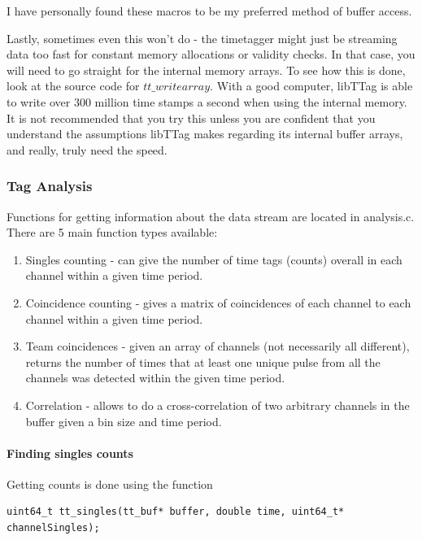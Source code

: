 \documentclass[10pt]{article}
\begin{document}
I have personally found these macros to be my preferred method of buffer access. 

Lastly, sometimes even this won't do - the timetagger might just be streaming data too fast
for constant memory allocations or validity checks. In that case, you will need to go straight for the internal memory arrays.
To see how this is done, look at the source code for $tt\_writearray$. With a good computer, libTTag is able to write over 300 million time stamps a second
when using the internal memory. It is not recommended that you try this unless you are confident that you understand the assumptions 
libTTag makes regarding its internal buffer arrays, and really, truly need the speed.


\subsubsection{Tag Analysis}
Functions for getting information about the data stream are located in analysis.c. There are 5 main function types available:
\begin{enumerate}
\item Singles counting - can give the number of time tags (counts) overall in each channel within a given time period.
\item Coincidence counting - gives a matrix of coincidences of each channel to each channel within a given time period.
\item Team coincidences - given an array of channels (not necessarily all different), returns the number of times that at least one unique pulse from all the channels was
detected within the given time period.
\item Correlation - allows to do a cross-correlation of two arbitrary channels in the buffer given a bin size and time period.
\end{enumerate}

\paragraph{Finding singles counts} Getting counts is done using the function 

\begin{verbatim}
uint64_t tt_singles(tt_buf* buffer, double time, uint64_t* channelSingles);
\end{verbatim}
\end{document}
